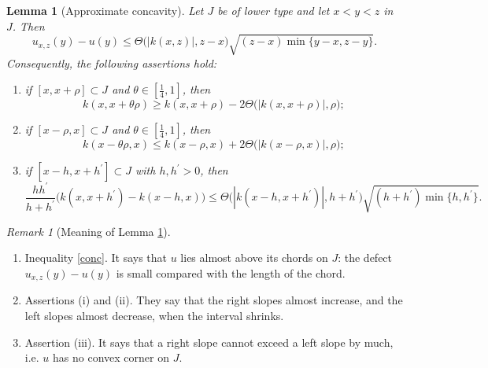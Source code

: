 \documentclass[reqno,12pt]{amsart}
\numberwithin{equation}{section}
\newtheorem{lemma}[theorem]{Lemma}
\theoremstyle{remark}
\newtheorem{remark}[theorem]{Remark}
\begin{document}
\begin{lemma}[Approximate concavity]\label{L-conc}
Let $J$ be of lower type and let $x<y<z$ in $J$. Then
\begin{equation}\label{conc}
u_{x,z}(y)-u(y)\leq\Theta\big(|k(x,z)|,z-x\big)\sqrt{(z-x)\min\{y-x,z-y\}}.
\end{equation}
Consequently, the following assertions hold{\rm:}
\begin{enumerate}[leftmargin=3em, itemsep=0.6em, topsep=0.6em]
\item[{\rm(i)}] if $[x,x+\rho]\subset J$ and $\theta\in[\frac14,1]$, then
\begin{equation*}
k(x,x+\theta\rho)\geq k(x,x+\rho)-2\Theta\big(|k(x,x+\rho)|,\rho\big);
\end{equation*}
\item[{\rm(ii)}] if $[x-\rho,x]\subset J$ and $\theta\in[\frac14,1]$, then
\begin{equation*}
k(x-\theta\rho,x)\leq k(x-\rho,x)+2\Theta\big(|k(x-\rho,x)|,\rho\big);
\end{equation*}
\item[{\rm(iii)}] if $[x-h,x+h^\prime]\subset J$ with $h,h^\prime>0$, then
\begin{equation*}
\frac{hh^\prime}{h+h^\prime}\big(k(x,x+h^\prime)-k(x-h,x)\big)\leq\Theta\big(|k(x-h,x+h^\prime)|,h+h^\prime\big)\sqrt{(h+h^\prime)\min\{h,h^\prime\}}.
\end{equation*}
\end{enumerate}
\end{lemma}

\begin{remark}[Meaning of Lemma \ref{L-conc}]\label{Remark-conc}
\begin{enumerate}[leftmargin=2em, itemsep=0.6em, topsep=0.6em]
\item[(a)] {\sf Inequality \eqref{conc}.} It says that $u$ lies almost above its chords on $J$: the defect $u_{x,z}(y)-u(y)$ is small compared with the length of the chord.
\item[(b)] {\sf Assertions (i) and (ii).} They say that the right slopes almost increase, and the left slopes almost decrease, when the interval shrinks.
\item[(c)] {\sf Assertion (iii).} It says that a right slope cannot exceed a left slope by much, i.e. $u$ has no convex corner on $J$.
\end{enumerate}
\end{remark}
\end{document}
